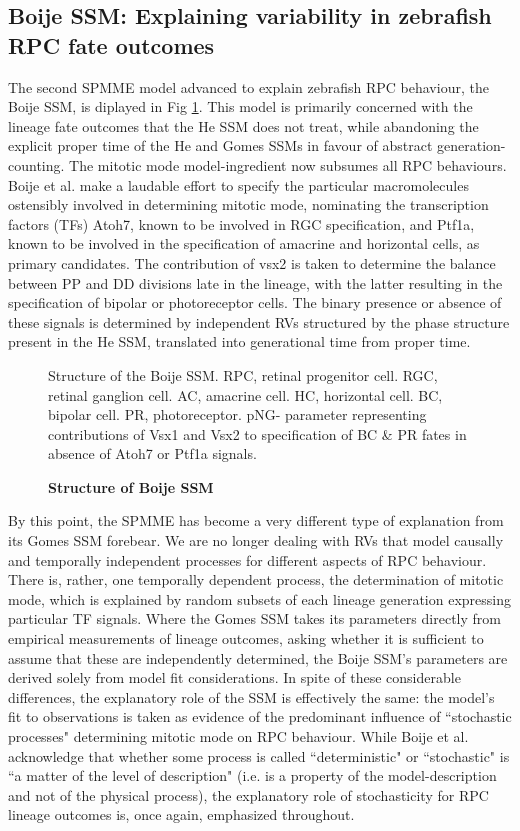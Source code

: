 \documentclass[10pt,letterpaper]{article}
\begin{document}
 \subsection*{Boije SSM: Explaining variability in zebrafish RPC fate outcomes}
 
The second SPMME model advanced to explain zebrafish RPC behaviour, the Boije SSM, is diplayed in Fig \ref{BoijeSSM}. This model is primarily concerned with the lineage fate outcomes that the He SSM does not treat, while abandoning the explicit proper time of the He and Gomes SSMs in favour of abstract generation-counting. The mitotic mode model-ingredient now subsumes all RPC behaviours. Boije et al. make a laudable effort to specify the particular macromolecules ostensibly involved in determining mitotic mode, nominating the transcription factors (TFs) Atoh7, known to be involved in RGC specification, and Ptf1a, known to be involved in the specification of amacrine and horizontal cells, as primary candidates. The contribution of vsx2 is taken to determine the balance between PP and DD divisions late in the lineage, with the latter resulting in the specification of bipolar or photoreceptor cells. The binary presence or absence of these signals is determined by independent RVs structured by the phase structure present in the He SSM, translated into generational time from proper time.

\begin{figure}[!h]
\caption{{\bf Structure of Boije SSM}}
Structure of the Boije SSM. RPC, retinal progenitor cell. RGC, retinal ganglion cell. AC, amacrine cell. HC, horizontal cell. BC, bipolar cell. PR, photoreceptor. pNG- parameter representing contributions of Vsx1 and Vsx2 to specification of BC \& PR fates in absence of Atoh7 or Ptf1a signals.
\label{BoijeSSM}
\end{figure}

By this point, the SPMME has become a very different type of explanation from its Gomes SSM forebear. We are no longer dealing with RVs that model causally and temporally independent processes for different aspects of RPC behaviour. There is, rather, one temporally dependent process, the determination of mitotic mode, which is explained by random subsets of each lineage generation expressing particular TF signals. Where the Gomes SSM takes its parameters directly from empirical measurements of lineage outcomes, asking whether it is sufficient to assume that these are independently determined, the Boije SSM's parameters are derived solely from model fit considerations. In spite of these considerable differences, the explanatory role of the SSM is effectively the same: the model's fit to observations is taken as evidence of the predominant influence of ``stochastic processes" determining mitotic mode on RPC behaviour. While Boije et al. acknowledge that whether some process is called ``deterministic" or ``stochastic" is ``a matter of the level of description"\cite{Boije2015} (i.e. is a property of the model-description and not of the physical process), the explanatory role of stochasticity for RPC lineage outcomes is, once again, emphasized throughout.
 
\end{document}
